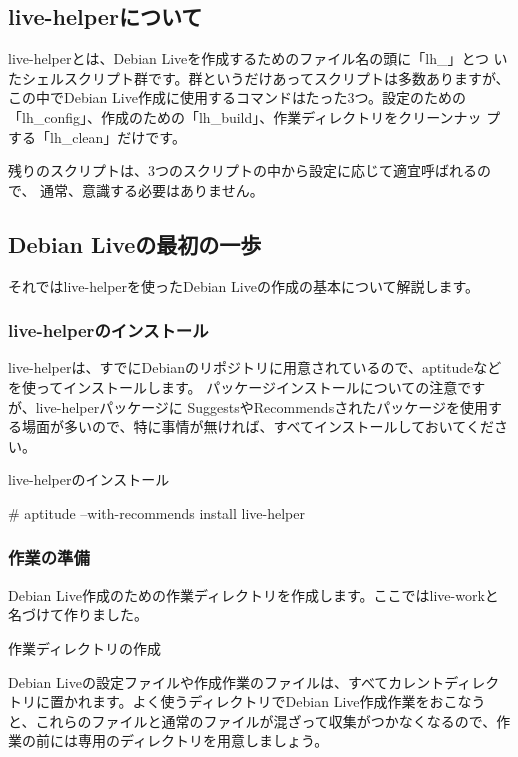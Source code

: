 \documentclass[mingoth,a4paper]{jsarticle}
\begin{document}
\subsection{live-helperについて}
live-helperとは、Debian Liveを作成するためのファイル名の頭に「lh\_」とつ
いたシェルスクリプト群です。群というだけあってスクリプトは多数ありますが、
この中でDebian Live作成に使用するコマンドはたった3つ。設定のための
「lh\_config」、作成のための「lh\_build」、作業ディレクトリをクリーンナッ
プする「lh\_clean」だけです。

残りのスクリプトは、3つのスクリプトの中から設定に応じて適宜呼ばれるので、
通常、意識する必要はありません。

\subsection{Debian Liveの最初の一歩}
それではlive-helperを使ったDebian Liveの作成の基本について解説します。

\subsubsection{live-helperのインストール}
live-helperは、すでにDebianのリポジトリに用意されているので、aptitudeなどを使ってインストールします。
パッケージインストールについての注意ですが、live-helperパッケージに
SuggestsやRecommendsされたパッケージを使用する場面が多いので、特に事情が無ければ、すべてインストールしておいてください。

live-helperのインストール
\begin{commandline}
 # aptitude --with-recommends install live-helper
\end{commandline}

\subsubsection{作業の準備}
Debian Live作成のための作業ディレクトリを作成します。ここではlive-workと名づけて作りました。

 作業ディレクトリの作成

Debian Liveの設定ファイルや作成作業のファイルは、すべてカレントディレクトリに置かれます。よく使うディレクトリでDebian Live作成作業をおこなうと、これらのファイルと通常のファイルが混ざって収集がつかなくなるので、作業の前には専用のディレクトリを用意しましょう。
\end{document}
